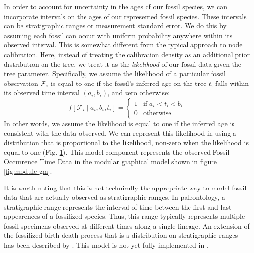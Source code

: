 In order to account for uncertainty in the ages of our fossil species, we can incorporate intervals on the ages of our represented fossil species.
These intervals can be stratigraphic ranges or measurement standard error.
We do this by assuming each fossil can occur with uniform probability anywhere within its observed interval.
This is somewhat different from the typical approach to node calibration.
Here, instead of treating the calibration density as an additional prior distribution on the tree, we treat it as the \textit{likelihood} of our fossil data given the tree parameter.
Specifically, we assume the likelihood of a particular fossil observation $\mathcal{F}_i$ is equal to one if the fossil's inferred age on the tree $t_i$ falls within its observed time interval $(a_i,b_i)$, and zero otherwise:
$$f[\mathcal{F}_i \mid a_i, b_i, t_i] = \begin{cases}
1 & \text{if } a_i < t_i < b_i\\
0 & \text{otherwise}
\end{cases}$$
In other words, we assume the likelihood is equal to one if the inferred age is consistent with the data observed.
We can represent this likelihood in \RevBayes using a distribution that is proportional to the likelihood, \IE non-zero when the likelihood is equal to one (Fig. \ref{fig:tipsampling_gm}).
This model component represents the observed \textsf{Fossil Occurrence Time Data} in the modular graphical model shown in figure \ref{fig:module-gm}.
\begin{figure}[h!]
\label{fig:tipsampling_gm}
\end{figure}


It is worth noting that this is not technically the appropriate way to model fossil data that are actually observed as stratigraphic ranges. 
In paleontology, a stratigraphic range represents the interval of time between the first and last appearences of a fossilized species. 
Thus, this range typically represents multiple fossil specimens observed at different times along a single lineage. 
An extension of the fossilized birth-death process that is a distribution on stratigraphic ranges has been described by \citet{Stadler2017}. 
This model is not yet fully implemented in \RevBayes.


